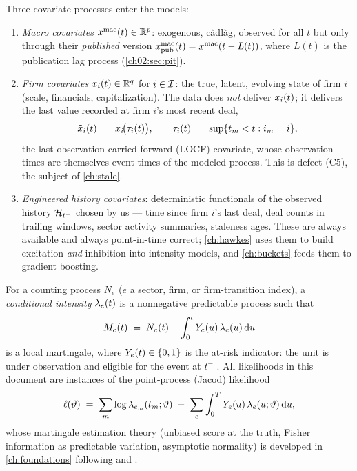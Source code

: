 \begin{definition}\label{def:ch02:covariates}
Three covariate processes enter the models:
\begin{enumerate}[label=(\roman*)]
\item \emph{Macro covariates} $x^{\mathrm{mac}}(t) \in \mathbb{R}^{p}$:
exogenous, c\`adl\`ag, observed for all $t$ but only through their
\emph{published} version $x^{\mathrm{mac}}_{\mathrm{pub}}(t) =
x^{\mathrm{mac}}(t - L(t))$, where $L(t)$ is the publication lag
process (\cref{ch02:sec:pit}).
\item \emph{Firm covariates} $x_i(t) \in \mathbb{R}^{q}$ for $i \in \mathcal{I}$:
the true, latent, evolving state of firm $i$ (scale, financials,
capitalization). The data does \emph{not} deliver $x_i(t)$; it
delivers the last value recorded at firm $i$'s most recent deal,
\begin{equation}\label{eq:ch02:locf}
\tilde{x}_i(t) \;=\; x_i\!\big(\tau_i(t)\big),
\qquad
\tau_i(t) \;=\; \sup\{t_m < t : i_m = i\},
\end{equation}
the last-observation-carried-forward (LOCF) covariate, whose observation
times are themselves event times of the modeled process. This is defect
(C5), the subject of \cref{ch:stale}.
\item \emph{Engineered history covariates}: deterministic functionals of
the observed history $\mathcal{H}_{t^-}$ chosen by us --- time since firm $i$'s
last deal, deal counts in trailing windows, sector activity summaries,
staleness ages. These are always available and always point-in-time
correct; \cref{ch:hawkes} uses them to build excitation \emph{and}
inhibition into intensity models, and \cref{ch:buckets} feeds them to
gradient boosting.
\end{enumerate}
\end{definition}

\begin{definition}\label{def:ch02:intensity}
For a counting process $N_e$ ($e$ a sector, firm, or firm-transition
index), a \emph{conditional intensity} $\lambda_e(t)$ is a nonnegative
predictable process such that
\begin{equation}\label{eq:ch02:martingale}
M_e(t) \;=\; N_e(t) - \int_0^{t} Y_e(u)\, \lambda_e(u) \,\mathrm{d} u
\end{equation}
is a local martingale, where $Y_e(t)\in\{0,1\}$ is the at-risk
indicator: the unit is under observation and eligible for the event at
$t^-$ \citep{abgk1993}. All likelihoods in this document are instances of
the point-process (Jacod) likelihood
\begin{equation}\label{eq:ch02:jacod}
\ell(\vartheta)
 \;=\;
 \sum_{m} \log \lambda_{e_m}(t_m;\vartheta)
 \;-\;
 \sum_{e} \int_{0}^{T} Y_e(u)\, \lambda_e(u;\vartheta) \,\mathrm{d} u,
\end{equation}
whose martingale estimation theory (unbiased score at the truth, Fisher
information as predictable variation, asymptotic normality) is developed in
\cref{ch:foundations} following \citet{abgk1993} and
\citet{andersengill1982}.
\end{definition}

